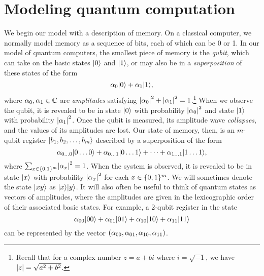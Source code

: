 \documentclass[12pt]{article}
\begin{document}
\section{Modeling quantum computation}
We begin our model with a description of memory. On a classical computer, we
normally model memory as a sequence of bits, each of which can be 0 or 1. In
our model of quantum computers, the smallest piece of memory is the
\emph{qubit}, which can take on the basic states $\qz$ and $\qo$, or may also be
in a \emph{superposition} of these states of the form
$$
  \alpha_0\qz + \alpha_1\qo,
$$
where $\alpha_0, \alpha_1 \in \CC$ are \emph{amplitudes} satisfying
$\abs*{\alpha_0}^2 + \abs*{\alpha_1}^2 = 1$.\footnote{Recall that for a complex
number $z = a + bi$ where $i=\sqrt{-1}$, we have $\abs*{z} = \sqrt{a^2+b^2}$.}
When we observe the qubit, it is revealed to be in state $\qz$ with probability
$\abs*{\alpha_0}^2$ and state $\qo$ with probability $\abs*{\alpha_1}^2$. Once
the qubit is measured, its amplitude wave \emph{collapses}, and the values of
its amplitudes are lost. Our state of memory, then, is an $m$-qubit register
$\reg*{b_1, b_2, \dots, b_m}$ described by a superposition of the form
$$
  \alpha_{0\dots 0}\reg*{0\dots 0}
  + \alpha_{0\dots 1}\reg*{0\dots 1}
  + \dots
  + \alpha_{1\dots 1} \reg*{1\dots 1},
$$
where $\sum_{x \in \zo^m} \abs*{\alpha_x}^2 = 1$. When the system is observed,
it is revealed to be in state $\reg*{x}$ with probability $\abs*{\alpha_x}^2$
for each $x \in \zo^m$. We will sometimes denote the state $\reg*{xy}$ as
$\reg*{x}\reg*{y}$. It will also often be useful to think of quantum states as
vectors of amplitudes, where the amplitudes are given in the lexicographic order
of their associated basic states. For example, a 2-qubit register in the state
$$
  \alpha_{00} \reg*{00}
  + \alpha_{01} \reg*{01}
  + \alpha_{10} \reg*{10}
  + \alpha_{11} \reg*{11}
$$
can be represented by the vector $\paren*{\alpha_{00}, \alpha_{01}, \alpha_{10},
\alpha_{11}}$.
\end{document}
